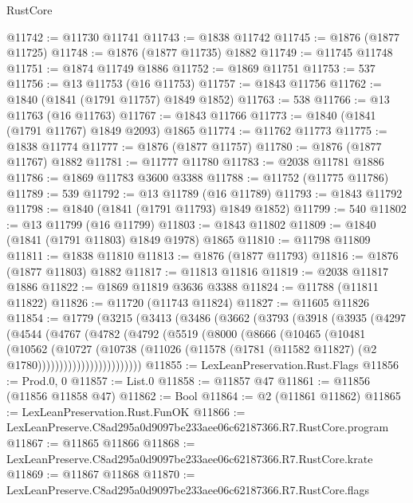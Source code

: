 \begin{lexlean}{RustCore}
\begin{coremodule}
@11742 := @11730 @11741
@11743 := @1838 @11742
@11745 := @1876 (@1877 @11725)
@11748 := @1876 (@1877 @11735) @1882
@11749 := @11745 @11748
@11751 := @1874 @11749 @1886
@11752 := @1869 @11751
@11753 := 537
@11756 := @13 @11753 (@16 @11753)
@11757 := @1843 @11756
@11762 := @1840 (@1841 (@1791 @11757) @1849 @1852)
@11763 := 538
@11766 := @13 @11763 (@16 @11763)
@11767 := @1843 @11766
@11773 := @1840 (@1841 (@1791 @11767) @1849 @2093) @1865
@11774 := @11762 @11773
@11775 := @1838 @11774
@11777 := @1876 (@1877 @11757)
@11780 := @1876 (@1877 @11767) @1882
@11781 := @11777 @11780
@11783 := @2038 @11781 @1886
@11786 := @1869 @11783 @3600 @3388
@11788 := @11752 (@11775 @11786)
@11789 := 539
@11792 := @13 @11789 (@16 @11789)
@11793 := @1843 @11792
@11798 := @1840 (@1841 (@1791 @11793) @1849 @1852)
@11799 := 540
@11802 := @13 @11799 (@16 @11799)
@11803 := @1843 @11802
@11809 := @1840 (@1841 (@1791 @11803) @1849 @1978) @1865
@11810 := @11798 @11809
@11811 := @1838 @11810
@11813 := @1876 (@1877 @11793)
@11816 := @1876 (@1877 @11803) @1882
@11817 := @11813 @11816
@11819 := @2038 @11817 @1886
@11822 := @1869 @11819 @3636 @3388
@11824 := @11788 (@11811 @11822)
@11826 := @11720 (@11743 @11824)
@11827 := @11605 @11826
@11854 := @1779
    (@3215
      (@3413
        (@3486
          (@3662
            (@3793
              (@3918
                (@3935
                  (@4297
                    (@4544
                      (@4767
                        (@4782
                          (@4792
                            (@5519
                              (@8000
                                (@8666
                                  (@10465
                                    (@10481
                                      (@10562
                                        (@10727
                                          (@10738
                                            (@11026
                                              (@11578
                                                (@1781
                                                  (@11582 @11827)
                                                  (@2 @1780))))))))))))))))))))))))
@11855 := LexLeanPreservation.Rust.Flags
@11856 := Prod.{0, 0}
@11857 := List.{0}
@11858 := @11857 @47
@11861 := @11856 (@11856 @11858 @47)
@11862 := Bool
@11864 := @2 (@11861 @11862)
@11865 := LexLeanPreservation.Rust.FunOK
@11866 := LexLeanPreserve.C8ad295a0d9097be233aee06c62187366.R7.RustCore.program
@11867 := @11865 @11866
@11868 := LexLeanPreserve.C8ad295a0d9097be233aee06c62187366.R7.RustCore.krate
@11869 := @11867 @11868
@11870 := LexLeanPreserve.C8ad295a0d9097be233aee06c62187366.R7.RustCore.flags

\end{coremodule}
\end{lexlean}

